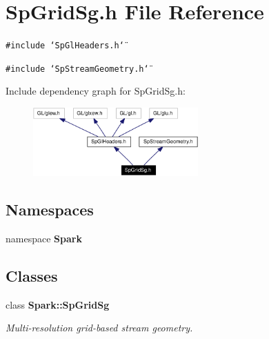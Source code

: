 \section{Sp\-Grid\-Sg.h File Reference}
\label{SpGridSg_8h}
{\tt \#include \char`\"{}Sp\-Gl\-Headers.h\char`\"{}}\par
{\tt \#include \char`\"{}Sp\-Stream\-Geometry.h\char`\"{}}\par


Include dependency graph for Sp\-Grid\-Sg.h:\begin{figure}[H]
\begin{center}
\leavevmode
\includegraphics[width=179pt]{SpGridSg_8h__incl}
\end{center}
\end{figure}
\subsection*{Namespaces}
\begin{CompactItemize}
\item 
namespace {\bf Spark}
\end{CompactItemize}
\subsection*{Classes}
\begin{CompactItemize}
\item 
class {\bf Spark::Sp\-Grid\-Sg}
\begin{CompactList}\small\item\em Multi-resolution grid-based stream geometry. \item\end{CompactList}\end{CompactItemize}
